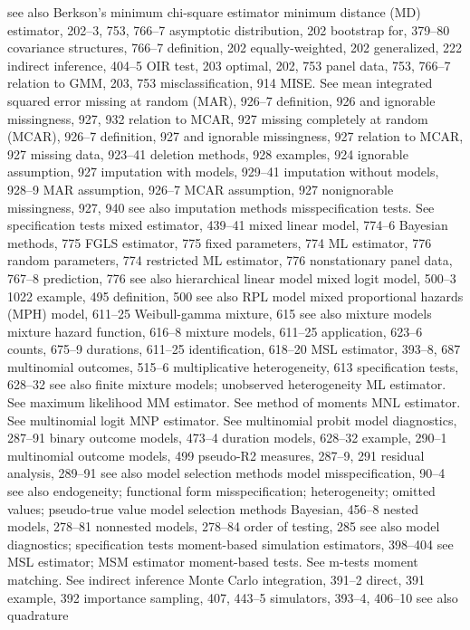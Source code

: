 see also Berkson’s minimum chi-square estimator minimum distance (MD) estimator, 202–3, 753, 766–7
asymptotic distribution, 202 bootstrap for, 379–80 covariance structures, 766–7 definition, 202 equally-weighted, 202 generalized, 222
indirect inference, 404–5 OIR test, 203
optimal, 202, 753
panel data, 753, 766–7 relation to GMM, 203, 753
misclassification, 914
MISE. See mean integrated squared error missing at random (MAR), 926–7
definition, 926
and ignorable missingness, 927, 932 relation to MCAR, 927
missing completely at random (MCAR), 926–7
definition, 927
and ignorable missingness, 927 relation to MCAR, 927
missing data, 923–41
deletion methods, 928
examples, 924
ignorable assumption, 927 imputation with models, 929–41 imputation without models, 928–9 MAR assumption, 926–7
MCAR assumption, 927 nonignorable missingness, 927, 940 see also imputation methods
misspecification tests. See specification tests mixed estimator, 439–41
mixed linear model, 774–6
Bayesian methods, 775
FGLS estimator, 775
fixed parameters, 774
ML estimator, 776
random parameters, 774 restricted ML estimator, 776 nonstationary panel data, 767–8 prediction, 776
see also hierarchical linear model mixed logit model, 500–3
1022
example, 495 definition, 500
see also RPL model
mixed proportional hazards (MPH) model, 611–25
Weibull-gamma mixture, 615
see also mixture models mixture hazard function, 616–8 mixture models, 611–25
application, 623–6
counts, 675–9
durations, 611–25
identification, 618–20
MSL estimator, 393–8, 687 multinomial outcomes, 515–6 multiplicative heterogeneity, 613 specification tests, 628–32
see also finite mixture models; unobserved heterogeneity
ML estimator. See maximum likelihood MM estimator. See method of moments MNL estimator. See multinomial logit MNP estimator. See multinomial probit model diagnostics, 287–91
binary outcome models, 473–4 duration models, 628–32 example, 290–1
multinomial outcome models, 499 pseudo-R2 measures, 287–9, 291 residual analysis, 289–91
see also model selection methods model misspecification, 90–4
see also endogeneity; functional form misspecification; heterogeneity; omitted values; pseudo-true value
model selection methods Bayesian, 456–8
nested models, 278–81 nonnested models, 278–84 order of testing, 285
see also model diagnostics; specification tests moment-based simulation estimators,
398–404
see MSL estimator; MSM estimator
moment-based tests. See m-tests moment matching. See indirect inference Monte Carlo integration, 391–2
direct, 391
example, 392
importance sampling, 407, 443–5 simulators, 393–4, 406–10
see also quadrature

